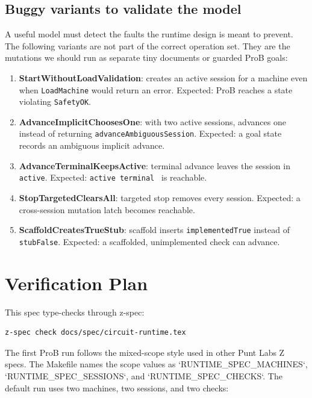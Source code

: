 \documentclass[a4paper,10pt,fleqn]{article}
\begin{document}
\subsection{Buggy variants to validate the model}

A useful model must detect the faults the runtime design is meant to prevent.
The following variants are not part of the correct operation set. They are the
mutations we should run as separate tiny documents or guarded ProB goals:

\begin{enumerate}
  \item \textbf{StartWithoutLoadValidation}: creates an active session for a
    machine even when \texttt{LoadMachine} would return an error. Expected:
    ProB reaches a state violating \texttt{SafetyOK}.
  \item \textbf{AdvanceImplicitChoosesOne}: with two active sessions, advances
    one instead of returning \texttt{advanceAmbiguousSession}. Expected: a goal
    state records an ambiguous implicit advance.
  \item \textbf{AdvanceTerminalKeepsActive}: terminal advance leaves the session
    in \texttt{active}. Expected: \texttt{active \cap terminal \neq \emptyset}
    is reachable.
  \item \textbf{StopTargetedClearsAll}: targeted stop removes every session.
    Expected: a cross-session mutation latch becomes reachable.
  \item \textbf{ScaffoldCreatesTrueStub}: scaffold inserts
    \texttt{implementedTrue} instead of \texttt{stubFalse}. Expected: a
    scaffolded, unimplemented check can advance.
\end{enumerate}

\section{Verification Plan}

This spec type-checks through z-spec:

\begin{verbatim}
z-spec check docs/spec/circuit-runtime.tex
\end{verbatim}

The first ProB run follows the mixed-scope style used in other Punt Labs Z
specs. The Makefile names the scope values as `RUNTIME_SPEC_MACHINES`,
`RUNTIME_SPEC_SESSIONS`, and `RUNTIME_SPEC_CHECKS`. The default run uses two
machines, two sessions, and two checks:
\end{document}
